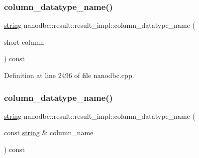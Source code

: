 \mbox{\label{classnanodbc_1_1result_1_1result__impl_ae4b110284fc7fc59212d3a03275d1623}} 
\subsubsection{\texorpdfstring{column\_datatype\_name()}{column\_datatype\_name()}\hspace{0.1cm}{\footnotesize\ttfamily [1/2]}}
{\footnotesize\ttfamily \mbox{\hyperlink{namespacenanodbc_abfc0ece56278e590911ec8352774c212}{string}} nanodbc\+::result\+::result\+\_\+impl\+::column\+\_\+datatype\+\_\+name (\begin{DoxyParamCaption}\item[{short}]{column }\end{DoxyParamCaption}) const\hspace{0.3cm}{\ttfamily [inline]}}



Definition at line 2496 of file nanodbc.\+cpp.

\mbox{\label{classnanodbc_1_1result_1_1result__impl_a752600f587af2fee42cfd7dcdc144fa6}} 
\subsubsection{\texorpdfstring{column\_datatype\_name()}{column\_datatype\_name()}\hspace{0.1cm}{\footnotesize\ttfamily [2/2]}}
{\footnotesize\ttfamily \mbox{\hyperlink{namespacenanodbc_abfc0ece56278e590911ec8352774c212}{string}} nanodbc\+::result\+::result\+\_\+impl\+::column\+\_\+datatype\+\_\+name (\begin{DoxyParamCaption}\item[{const \mbox{\hyperlink{namespacenanodbc_abfc0ece56278e590911ec8352774c212}{string}} \&}]{column\+\_\+name }\end{DoxyParamCaption}) const\hspace{0.3cm}{\ttfamily [inline]}}



